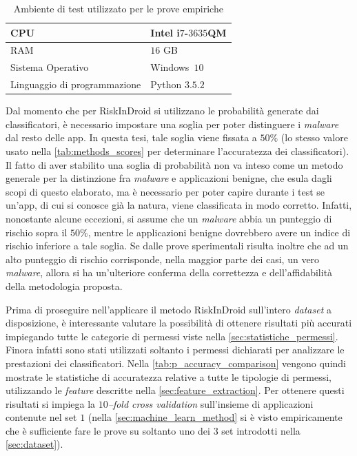 \documentclass[12pt,a4paper,oneside]{article}
\begin{document}
\begin{table}[!htb]
    \renewcommand{\arraystretch}{1.3}
    \centering
    \begin{tabular}{|>{\centering\arraybackslash}m{}|>{\centering\arraybackslash}m{}|}
        \hline
        CPU & Intel i$7$-$3635$QM\\\hline
        RAM & $16$ GB\\\hline
        Sistema Operativo & Windows~$10$\\\hline
        Linguaggio di programmazione & Python $3.5.2$\\\hline
    \end{tabular}
    \caption{Ambiente di test utilizzato per le prove empiriche}
    \label{tab:test_env}
\end{table}

\noindent Dal momento che per RiskInDroid si utilizzano le probabilità generate dai classificatori, è necessario impostare una soglia per poter distinguere i \textit{malware} dal resto delle app. In questa tesi, tale soglia viene fissata a $50\%$ (lo stesso valore usato nella \cref{tab:methods_scores} per determinare l'accuratezza dei classificatori). Il fatto di aver stabilito una soglia di probabilità non va inteso come un metodo generale per la distinzione fra \textit{malware} e applicazioni benigne, che esula dagli scopi di questo elaborato, ma è necessario per poter capire durante i test se un'app, di cui si conosce già la natura, viene classificata in modo corretto. Infatti, nonostante alcune eccezioni, si assume che un \textit{malware} abbia un punteggio di rischio sopra il $50\%$, mentre le applicazioni benigne dovrebbero avere un indice di rischio inferiore a tale soglia. Se dalle prove sperimentali risulta inoltre che ad un alto punteggio di rischio corrisponde, nella maggior parte dei casi, un vero \textit{malware}, allora si ha un'ulteriore conferma della correttezza e dell'affidabilità della metodologia proposta.

Prima di proseguire nell'applicare il metodo RiskInDroid sull'intero \textit{dataset} a disposizione, è interessante valutare la possibilità di ottenere risultati più accurati impiegando tutte le categorie di permessi viste nella \cref{sec:statistiche_permessi}. Finora infatti sono stati utilizzati soltanto i permessi dichiarati per analizzare le prestazioni dei classificatori. Nella \cref{tab:p_accuracy_comparison} vengono quindi mostrate le statistiche di accuratezza relative a tutte le tipologie di permessi, utilizzando le \textit{feature} descritte nella \cref{sec:feature_extraction}. Per ottenere questi risultati si impiega la \textit{$10$--fold cross validation} sull'insieme di applicazioni contenute nel set $1$ (nella \cref{sec:machine_learn_method} si è visto empiricamente che è sufficiente fare le prove su soltanto uno dei $3$ set introdotti nella \cref{sec:dataset}).
\end{document}
